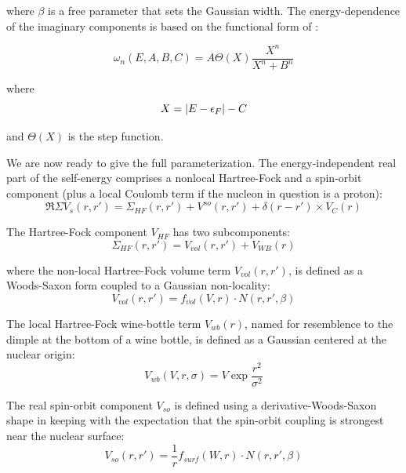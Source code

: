 \noindent
where $\beta$ is a free parameter that sets the Gaussian width. The energy-dependence of the
imaginary components is based on the functional form of \cite{Charity2006}:

\begin{equation}
    \omega_{n}(E, A, B, C) = A\Theta(X)\frac{X^{n}}{X^{n}+B^{n}}
\end{equation}

\noindent
where
\begin{equation*}
    X = |E-\epsilon_{F}|-C\\
\end{equation*}

and $\Theta(X)$ is the step function. 

We are now ready to give the full parameterization.  
The energy-independent real part of the self-energy comprises a nonlocal Hartree-Fock and
a spin-orbit component (plus a local Coulomb term if the nucleon in question is a proton):
\begin{equation}
    \Re{\Sigma}V_{s}(r,r') = \Sigma_{HF}(r,r')+V^{so}(r,r')+\delta(r-r')\times V_{C}(r)
\end{equation}

\noindent
The Hartree-Fock component $V_{HF}$ has two subcomponents:
\begin{equation}
    \Sigma_{HF}(r,r') = V_{vol}(r,r') + V_{WB}(r)
\end{equation}

\noindent
where the non-local Hartree-Fock volume term $V_{vol}(r,r')$, is defined as
a Woods-Saxon form coupled to a Gaussian non-locality:
\begin{equation}
    V_{vol}(r,r') = f_{vol}(V,r){\cdot}N(r,r',\beta)
\end{equation}

The local Hartree-Fock wine-bottle
term $V_{wb}(r)$, named for resemblence to the dimple at the bottom of a wine
bottle, is defined as a Gaussian centered at the nuclear origin:
\begin{equation}
    V_{wb}(V, r,\sigma) = V\exp{\frac{r^{2}}{\sigma^{2}}}
\end{equation}

\noindent
The real spin-orbit component $V_{so}$
is defined using a derivative-Woods-Saxon shape in keeping with the
expectation that the spin-orbit coupling is strongest near the
nuclear surface:
\begin{equation}
    V_{so}(r,r') =
    \frac{1}{r}f_{surf}(W,r){\cdot}N(r,r',\beta)
\end{equation}

